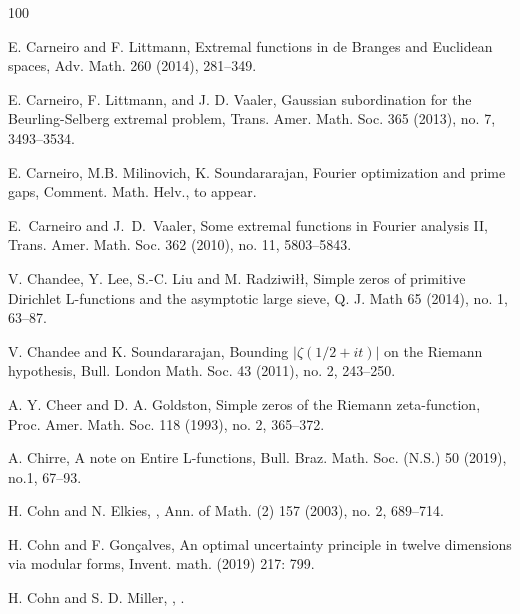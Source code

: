 \documentclass[reqno]{amsart}
\begin{document}
\begin{thebibliography}{100}
	
	E. Carneiro and F. Littmann,
	\newblock Extremal functions in de Branges and Euclidean spaces,
	\newblock Adv. Math. 260 (2014), 281--349.
	
	
	
	E. Carneiro, F. Littmann, and J. D. Vaaler,
	\newblock Gaussian subordination for the Beurling-Selberg extremal problem,
	\newblock Trans. Amer. Math. Soc. 365 (2013), no. 7, 3493--3534. 
	
	
	
	
	E. Carneiro, M.B. Milinovich, K. Soundararajan, { Fourier optimization and prime gaps}, Comment. Math. Helv., to appear.
	
	
	
	
	
	E.~Carneiro and J.~D.~Vaaler,
	\newblock Some extremal functions in Fourier analysis II,
	\newblock Trans. Amer. Math. Soc. 362 (2010), no. 11, 5803--5843.
	
	
	
	
	V. Chandee, Y. Lee, S.-C. Liu and M. Radziwi\l\l, 
	\newblock Simple zeros of primitive Dirichlet L-functions and the asymptotic large sieve,
	\newblock Q. J. Math 65 (2014), no. 1, 63--87.
	
	
	
	
	V. Chandee and K. Soundararajan, 
	\newblock Bounding $|\zeta(1/2+it)|$ on the Riemann hypothesis, 
	\newblock Bull. London Math. Soc. 43 (2011), no. 2, 243--250.
	
	
	
	A. Y. Cheer and D. A. Goldston, 
	\newblock Simple zeros of the Riemann zeta-function, 
	\newblock Proc. Amer. Math. Soc. 118 (1993), no. 2, 365--372.
	
	  A. Chirre,
\newblock A note on Entire L-functions,
\newblock Bull. Braz. Math. Soc. (N.S.) 50 (2019), no.1, 67--93.


	
	
	H. Cohn and N. Elkies, 
	, 
	\newblock Ann. of Math. (2) 157 (2003), no. 2, 689--714. 
	
	
	  H. Cohn and F. Gon\c{c}alves,
\newblock An optimal uncertainty principle in twelve dimensions via modular forms,
\newblock Invent. math. (2019) 217: 799.
	
	H. Cohn and S. D. Miller, 
	, 
	.
	

\end{thebibliography}
\end{document}
